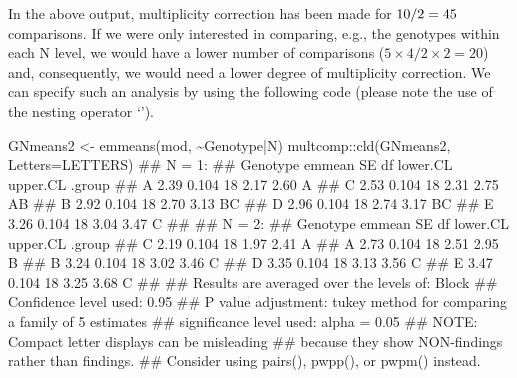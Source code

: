 \documentclass[a4paper,12pt,oneside]{book}
\newenvironment{Shaded}{\begin{snugshade}}{\end{snugshade}}
\newcommand{\SpecialCharTok}[1]{#1}
\newcommand{\DocumentationTok}[1]{#1}
\newcommand{\OtherTok}[1]{#1}
\newcommand{\FunctionTok}[1]{#1}
\newcommand{\AttributeTok}[1]{#1}
\newcommand{\AlertTok}[1]{#1}
\newcommand{\NormalTok}[1]{#1}
\begin{document}
In the above output, multiplicity correction has been made for \(10 \time 9 / 2 = 45\) comparisons. If we were only interested in comparing, e.g., the genotypes within each N level, we would have a lower number of comparisons (\(5 \times 4/2 \times 2 = 20\)) and, consequently, we would need a lower degree of multiplicity correction. We can specify such an analysis by using the following code (please note the use of the nesting operator `\textbar{}').

\vspace{12pt}

\begin{Shaded}
\begin{Highlighting}[]
\NormalTok{GNmeans2 }\OtherTok{\textless{}{-}} \FunctionTok{emmeans}\NormalTok{(mod, }\SpecialCharTok{\textasciitilde{}}\NormalTok{Genotype}\SpecialCharTok{|}\NormalTok{N)}
\NormalTok{multcomp}\SpecialCharTok{::}\FunctionTok{cld}\NormalTok{(GNmeans2, }\AttributeTok{Letters=}\NormalTok{LETTERS)}
\DocumentationTok{\#\# N = 1:}
\DocumentationTok{\#\#  Genotype emmean    SE df lower.CL upper.CL .group}
\DocumentationTok{\#\#  A          2.39 0.104 18     2.17     2.60  A    }
\DocumentationTok{\#\#  C          2.53 0.104 18     2.31     2.75  AB   }
\DocumentationTok{\#\#  B          2.92 0.104 18     2.70     3.13   BC  }
\DocumentationTok{\#\#  D          2.96 0.104 18     2.74     3.17   BC  }
\DocumentationTok{\#\#  E          3.26 0.104 18     3.04     3.47    C  }
\DocumentationTok{\#\# }
\DocumentationTok{\#\# N = 2:}
\DocumentationTok{\#\#  Genotype emmean    SE df lower.CL upper.CL .group}
\DocumentationTok{\#\#  C          2.19 0.104 18     1.97     2.41  A    }
\DocumentationTok{\#\#  A          2.73 0.104 18     2.51     2.95   B   }
\DocumentationTok{\#\#  B          3.24 0.104 18     3.02     3.46    C  }
\DocumentationTok{\#\#  D          3.35 0.104 18     3.13     3.56    C  }
\DocumentationTok{\#\#  E          3.47 0.104 18     3.25     3.68    C  }
\DocumentationTok{\#\# }
\DocumentationTok{\#\# Results are averaged over the levels of: Block }
\DocumentationTok{\#\# Confidence level used: 0.95 }
\DocumentationTok{\#\# P value adjustment: tukey method for comparing a family of 5 estimates }
\DocumentationTok{\#\# significance level used: alpha = 0.05 }
\DocumentationTok{\#\# }\AlertTok{NOTE}\DocumentationTok{: Compact letter displays can be misleading}
\DocumentationTok{\#\#       because they show NON{-}findings rather than findings.}
\DocumentationTok{\#\#       Consider using \textquotesingle{}pairs()\textquotesingle{}, \textquotesingle{}pwpp()\textquotesingle{}, or \textquotesingle{}pwpm()\textquotesingle{} instead.}
\end{Highlighting}
\end{Shaded}
\end{document}
